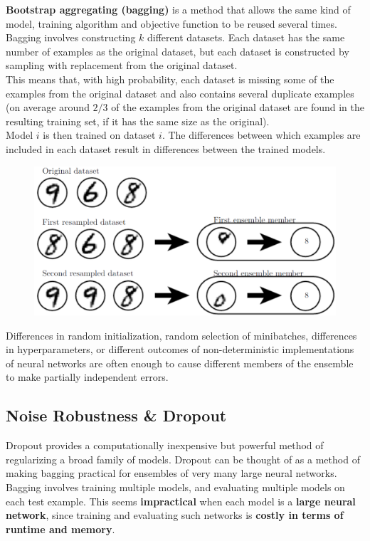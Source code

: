 \begin{multicols}{2}
	\textbf{Bootstrap aggregating (bagging)} is a method that allows the same kind of model, training algorithm and objective function to be reused several times.
	Bagging involves constructing $k$ different datasets. Each dataset has the same number of examples as the original dataset, but each dataset is constructed by sampling with replacement from the original dataset.\\
	This means that, with high probability, each dataset is missing some of the examples from the original dataset and also contains several duplicate examples (on average around $2/3$ of the examples from the original dataset are found in the resulting training set, if it has the same size as the original).\\
	Model $i$ is then trained on dataset $i$. The differences between which examples are included in each dataset result in differences between the trained models.
	\begin{figure}[H]
		\centering
		\includegraphics[width=0.85\linewidth]{images/bagging.PNG}
	\end{figure}
	Differences in random initialization, random selection of minibatches, differences in hyperparameters, or different outcomes of non-deterministic implementations of neural networks are often enough to cause different members of the ensemble to make partially independent errors.

	\subsection{Noise Robustness \& Dropout}
	Dropout provides a computationally inexpensive but powerful method of regularizing a broad family of models.
	Dropout can be thought of as a method of making bagging practical for ensembles of very many large neural networks.
	Bagging involves training multiple models, and evaluating multiple models on each test example.
	This seems \textbf{impractical} when each model is a \textbf{large neural network}, since training and evaluating such networks is \textbf{costly in terms of runtime and memory}.\\


\end{multicols}
